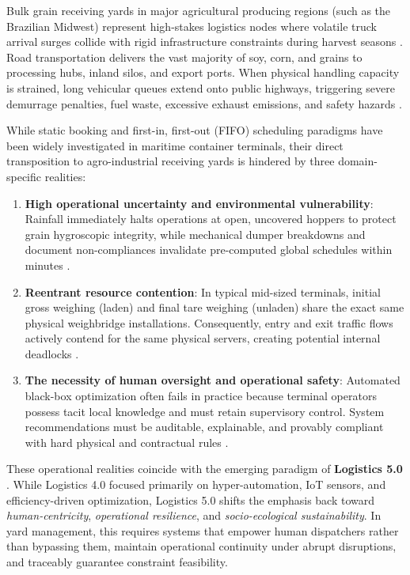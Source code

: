 \documentclass[12pt,a4paper]{article}
\begin{document}
Bulk grain receiving yards in major agricultural producing regions (such as the Brazilian Midwest) represent high-stakes logistics nodes where volatile truck arrival surges collide with rigid infrastructure constraints during harvest seasons \parencite{abdelmagidComprehensiveReviewTruck2022a, graciaTruckAppointmentScheduling2025a}. Road transportation delivers the vast majority of soy, corn, and grains to processing hubs, inland silos, and export ports. When physical handling capacity is strained, long vehicular queues extend onto public highways, triggering severe demurrage penalties, fuel waste, excessive exhaust emissions, and safety hazards \parencite{fioroniFarmPortSimulation2015a, bouyahiaNovelTruckAppointment2025b}.

While static booking and first-in, first-out (FIFO) scheduling paradigms have been widely investigated in maritime container terminals, their direct transposition to agro-industrial receiving yards is hindered by three domain-specific realities:
\begin{enumerate}[leftmargin=1.2cm,itemsep=0pt,topsep=2pt]
  \item \textbf{High operational uncertainty and environmental vulnerability}: Rainfall immediately halts operations at open, uncovered hoppers to protect grain hygroscopic integrity, while mechanical dumper breakdowns and document non-compliances invalidate pre-computed global schedules within minutes \parencite{liProcessSchedulingUncertainty2008a, r.berrutoAnalyzingReceivingOperation2001a}.
  \item \textbf{Reentrant resource contention}: In typical mid-sized terminals, initial gross weighing (laden) and final tare weighing (unladen) share the exact same physical weighbridge installations. Consequently, entry and exit traffic flows actively contend for the same physical servers, creating potential internal deadlocks \parencite{gravesSchedulingReentrantFlow1983, ruizHybridFlowShop2010}.
  \item \textbf{The necessity of human oversight and operational safety}: Automated black-box optimization often fails in practice because terminal operators possess tacit local knowledge and must retain supervisory control. System recommendations must be auditable, explainable, and provably compliant with hard physical and contractual rules \parencite{vanderheydenDecisionSupportSystem1985a, mardanehDecisionSupportSystem2021a}.
\end{enumerate}

These operational realities coincide with the emerging paradigm of \textbf{Logistics 5.0} \parencite{dasilvaIntegrationMachineLearning2023, torbaliMultiagentbasedRealtimeTruck2023}. While Logistics 4.0 focused primarily on hyper-automation, IoT sensors, and efficiency-driven optimization, Logistics 5.0 shifts the emphasis back toward \emph{human-centricity}, \emph{operational resilience}, and \emph{socio-ecological sustainability}. In yard management, this requires systems that empower human dispatchers rather than bypassing them, maintain operational continuity under abrupt disruptions, and traceably guarantee constraint feasibility.
\end{document}
